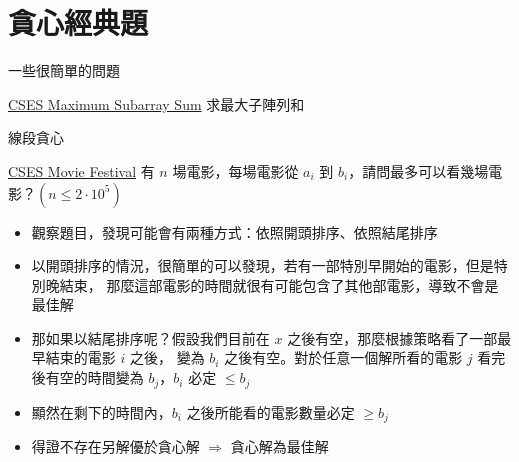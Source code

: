 \documentclass[aspectratio=169]{beamer}
\begin{document}
    \section{貪心經典題}

    \begin{frame}{一些很簡單的問題}
        \begin{block}{\href{https://cses.fi/problemset/task/1643}{CSES Maximum Subarray Sum}}
            求最大子陣列和
        \end{block}
    \end{frame}

    \begin{frame}{線段貪心}
        \begin{block}{\href{https://cses.fi/problemset/task/1629}{CSES Movie Festival}}
            有 $n$ 場電影，每場電影從 $a_i$ 到 $b_i$，請問最多可以看幾場電影？$(n \le 2 \cdot 10^5)$
        \end{block}

        \begin{itemize}
            \item<1-> 觀察題目，發現可能會有兩種方式：依照開頭排序、依照結尾排序
            \item<2-> 以開頭排序的情況，很簡單的可以發現，若有一部特別早開始的電影，但是特別晚結束，
            那麼這部電影的時間就很有可能包含了其他部電影，導致不會是最佳解
            \item<3-> 那如果以結尾排序呢？假設我們目前在 $x$ 之後有空，那麼根據策略看了一部最早結束的電影 $i$ 之後，
            變為 $b_i$ 之後有空。對於任意一個解所看的電影 $j$ 看完後有空的時間變為 $b_j$，$b_i$ 必定 $\le b_j$
            \item<4-> 顯然在剩下的時間內，$b_i$ 之後所能看的電影數量必定 $\ge b_j$
            \item<5-> 得證不存在另解優於貪心解 $\Rightarrow$ 貪心解為最佳解
        \end{itemize}
    \end{frame}
\end{document}
